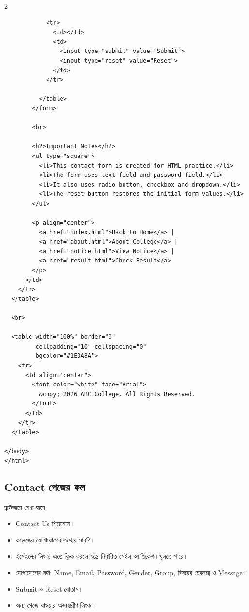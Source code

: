 \begin{multicols}{2}
\begin{verbatim}
            <tr>
              <td></td>
              <td>
                <input type="submit" value="Submit">
                <input type="reset" value="Reset">
              </td>
            </tr>

          </table>
        </form>

        <br>

        <h2>Important Notes</h2>
        <ul type="square">
          <li>This contact form is created for HTML practice.</li>
          <li>The form uses text field and password field.</li>
          <li>It also uses radio button, checkbox and dropdown.</li>
          <li>The reset button restores the initial form values.</li>
        </ul>

        <p align="center">
          <a href="index.html">Back to Home</a> |
          <a href="about.html">About College</a> |
          <a href="notice.html">View Notice</a> |
          <a href="result.html">Check Result</a>
        </p>
      </td>
    </tr>
  </table>

  <br>

  <table width="100%" border="0"
         cellpadding="10" cellspacing="0"
         bgcolor="#1E3A8A">
    <tr>
      <td align="center">
        <font color="white" face="Arial">
          &copy; 2026 ABC College. All Rights Reserved.
        </font>
      </td>
    </tr>
  </table>

</body>
</html>
\end{verbatim}
\end{multicols}


\subsection{Contact পেজের ফল}

ব্রাউজারে দেখা যাবে:
\par\noindent
\begin{minipage}[t]{.48\linewidth}\vspace{0pt}
\begin{itemize}
\item Contact Us শিরোনাম।
\item কলেজের যোগাযোগের তথ্যের সারণি।
\item ইমেইলের লিংক; এতে ক্লিক করলে যন্ত্রে নির্ধারিত মেইল অ্যাপ্লিকেশন খুলতে পারে।
\end{itemize}
\end{minipage}\hfill
\begin{minipage}[t]{.48\linewidth}\vspace{0pt}
\begin{itemize}
\item যোগাযোগের ফর্ম: Name, Email, Password, Gender, Group, বিষয়ের চেকবক্স ও Message।
\item Submit ও Reset বোতাম।
\item অন্য পেজে যাওয়ার অভ্যন্তরীণ লিংক।
\end{itemize}
\end{minipage}\par


